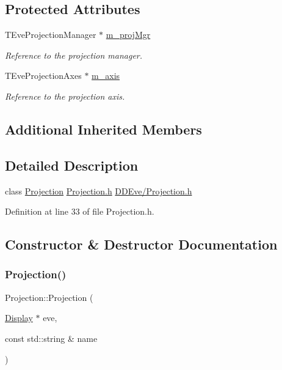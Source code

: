 \subsection*{Protected Attributes}
\begin{DoxyCompactItemize}
\item 
T\+Eve\+Projection\+Manager $\ast$ \hyperlink{class_d_d4hep_1_1_projection_af3e297ffc1962b82749d48fe43ed6830}{m\+\_\+proj\+Mgr}
\begin{DoxyCompactList}\small\item\em Reference to the projection manager. \end{DoxyCompactList}\item 
T\+Eve\+Projection\+Axes $\ast$ \hyperlink{class_d_d4hep_1_1_projection_a694863e25d4dab1fda8bf4221f099402}{m\+\_\+axis}
\begin{DoxyCompactList}\small\item\em Reference to the projection axis. \end{DoxyCompactList}\end{DoxyCompactItemize}
\subsection*{Additional Inherited Members}


\subsection{Detailed Description}
class \hyperlink{class_d_d4hep_1_1_projection}{Projection} \hyperlink{_projection_8h}{Projection.\+h} \hyperlink{_projection_8h}{D\+D\+Eve/\+Projection.\+h} 

Definition at line 33 of file Projection.\+h.



\subsection{Constructor \& Destructor Documentation}
\hypertarget{class_d_d4hep_1_1_projection_a2fc1deae77bf065c122bd6d5c4f1abf7}{}\label{class_d_d4hep_1_1_projection_a2fc1deae77bf065c122bd6d5c4f1abf7} 
\subsubsection{\texorpdfstring{Projection()}{Projection()}}
{\footnotesize\ttfamily Projection\+::\+Projection (\begin{DoxyParamCaption}\item[{\hyperlink{class_d_d4hep_1_1_display}{Display} $\ast$}]{eve,  }\item[{const std\+::string \&}]{name }\end{DoxyParamCaption})}



